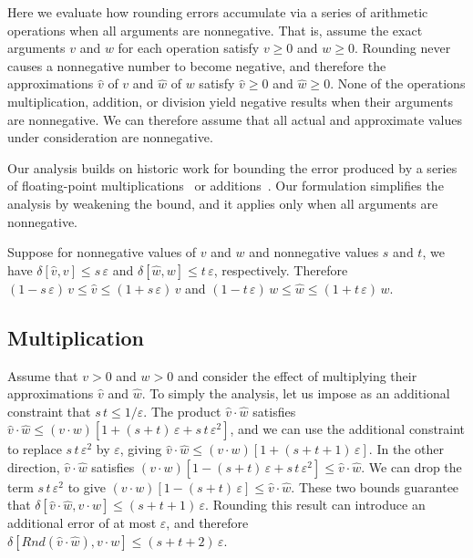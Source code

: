 \documentclass[letterpaper,USenglish,cleveref, autoref, thm-restate]{lipics-v2021}
\newcommand{\approximate}[1]{\hat{#1}}
\newcommand{\approxv}{\approximate{v}}
\newcommand{\approxw}{\approximate{w}}
\newcommand{\round}{\mathit{Rnd}}
\newcommand{\aerror}{\delta}
\newcommand{\roundepsilon}{\varepsilon}
\begin{document}
Here we evaluate how rounding errors accumulate via a series of
arithmetic operations when all arguments are nonnegative.
That is, assume the exact arguments $v$ and $w$ for each operation satisfy $v \geq 0$ and $w \geq 0$.
Rounding never causes a nonnegative number to become negative, and therefore 
the approximations $\approxv$ of  $v$ and $\approxw$ of $w$ satisfy $\approxv \geq 0$ and $\approxw \geq 0$.
None of the operations multiplication, addition, or division yield negative results when their arguments are nonnegative.
We can therefore
assume that all actual and approximate values under consideration are
nonnegative.

Our analysis builds on historic work for bounding the error produced
by a series of floating-point
multiplications~\cite{muller:hfpa:2018,wilkinson:nm:1960,wilkinson:rounding:1963} or
additions~\cite{higham:siam:1993}.  Our formulation simplifies the analysis
by weakening the
bound, and it applies only when
all arguments are nonnegative.

Suppose for nonnegative values of $v$ and $w$ and nonnegative values $s$ and $t$, we have
$\aerror[\approxv, v] \leq s\, \roundepsilon$ and
$\aerror[\approxw, w] \leq t\, \roundepsilon$, respectively.
Therefore
$(1-s\,\roundepsilon)\, v \leq \approxv \leq (1+s\,\roundepsilon)\, v$ and
$(1-t\,\roundepsilon)\, w \leq \approxw \leq (1+t\,\roundepsilon)\, w$.


\subsection{Multiplication}

Assume that $v > 0$ and $w > 0$ and consider the effect of multiplying their approximations
$\approxv$ and $\approxw$.  To simply the analysis, let us impose as an additional constraint that $s\,t \leq 1/\roundepsilon$.
The product $\approxv \cdot \approxw$  satisfies
$\approxv \cdot \approxw \leq (v\cdot w) [1 + (s+t)\,\roundepsilon + s\,t\,\roundepsilon^2]$, and we can use the additional constraint to replace $s\,t\,\roundepsilon^2$ by $\roundepsilon$,
giving
$\approxv \cdot \approxw \leq (v\cdot w) [1 + (s+t+1)\,\roundepsilon]$.
In the other direction, $\approxv \cdot \approxw$ satisfies
$(v\cdot w) [1 - (s+t)\,\roundepsilon + s\,t\,\roundepsilon^2] \leq \approxv \cdot \approxw$.  We can drop the term
$s\,t\,\roundepsilon^2$ to give
$(v\cdot w) [1 - (s+t)\,\roundepsilon] \leq \approxv \cdot \approxw$.  These two bounds guarantee that
$\aerror[\approxv \cdot \approxw, v \cdot w] \leq (s+t+1)\,\roundepsilon$.
Rounding this result can introduce an additional error of at most $\roundepsilon$, and therefore
$\aerror[\round(\approxv \cdot \approxw), v \cdot w] \leq (s+t+2)\,\roundepsilon$.
\end{document}
